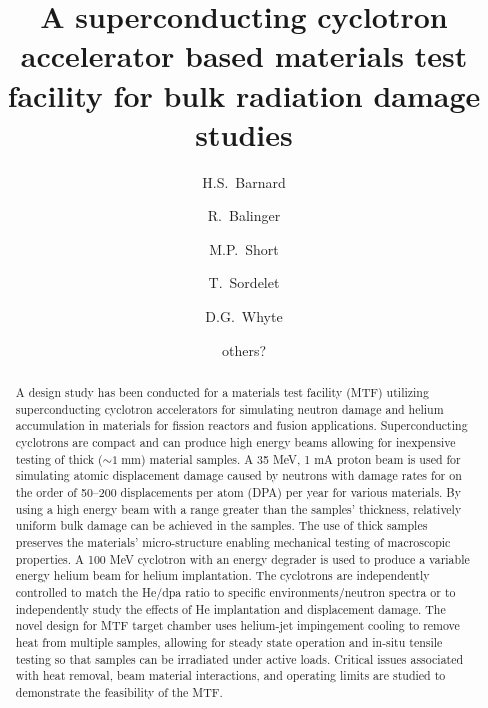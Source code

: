 \documentclass[final,3p,times,twocolumn]{elsarticle} %
\begin{document}

\begin{frontmatter}

\title{A superconducting cyclotron accelerator based materials test facility for bulk radiation damage studies}


\author{H.S.~Barnard}
\author{R.~Balinger}
\author{M.P.~Short}
\author{T.~Sordelet}
\author{D.G.~Whyte}
\author{others?}

\address{Massachusetts Institute of
  Technology, Nuclear Science and Engineering. 
  Cambridge, Massachusetts, USA}


\begin{abstract}

A design study has been conducted for a materials test facility (MTF) utilizing superconducting cyclotron accelerators for simulating neutron damage and helium accumulation in materials for fission reactors and fusion applications.  Superconducting cyclotrons are compact and can produce high energy beams allowing for inexpensive testing of thick ($\sim 1\;\mathrm{mm}$) material samples.  A 35 MeV, 1 mA proton beam is used for simulating atomic displacement damage caused by neutrons with damage rates for on the order of 50--200 displacements per atom (DPA) per year for various materials.  By using a high energy beam with a range greater than the samples' thickness, relatively uniform bulk damage can be achieved in the samples.  The use of thick samples preserves the materials' micro-structure enabling mechanical testing of macroscopic properties.  A 100 MeV cyclotron with an energy degrader is used to produce a variable energy helium beam for helium implantation.  The cyclotrons are independently controlled to match the He/dpa ratio to specific environments/neutron spectra or to independently study the effects of He implantation and displacement damage.  The novel design for MTF target chamber uses helium-jet impingement cooling to remove heat from multiple samples, allowing for steady state operation and in-situ tensile testing so that samples can be irradiated under active loads.  Critical issues associated with heat removal, beam material interactions, and operating limits are studied to demonstrate the feasibility of the MTF.

\end{abstract}


\end{frontmatter}
\end{document}
